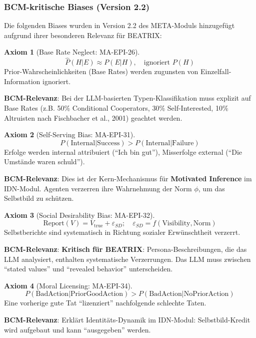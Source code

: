 \documentclass[11pt,a4paper]{article}
\theoremstyle{definition}
\newtheorem{axiom}{Axiom}[section]
\theoremstyle{plain}
\newcommand{\META}{\textsc{META}}
\newcommand{\BEATRIX}{\textsc{BEATRIX}}
\begin{document}
\subsubsection{BCM-kritische Biases (Version 2.2)}

Die folgenden Biases wurden in Version 2.2 des \META-Moduls hinzugefügt aufgrund ihrer besonderen Relevanz für \BEATRIX:

\begin{axiom}[Base Rate Neglect: MA-EPI-26]
\begin{equation}
\hat{P}(H|E) \approx P(E|H), \quad \text{ignoriert } P(H)
\end{equation}
Prior-Wahrscheinlichkeiten (Base Rates) werden zugunsten von Einzelfall-Information ignoriert.

\textbf{BCM-Relevanz}: Bei der LLM-basierten Typen-Klassifikation muss explizit auf Base Rates (z.B. 50\% Conditional Cooperators, 30\% Self-Interested, 10\% Altruisten nach Fischbacher et al., 2001) geachtet werden.
\end{axiom}

\begin{axiom}[Self-Serving Bias: MA-EPI-31]
\begin{equation}
P(\text{Internal}|\text{Success}) > P(\text{Internal}|\text{Failure})
\end{equation}
Erfolge werden internal attribuiert (``Ich bin gut''), Misserfolge external (``Die Umstände waren schuld'').

\textbf{BCM-Relevanz}: Dies ist der Kern-Mechanismus für \textbf{Motivated Inference} im IDN-Modul. Agenten verzerren ihre Wahrnehmung der Norm $\phi$, um das Selbstbild zu schützen.
\end{axiom}

\begin{axiom}[Social Desirability Bias: MA-EPI-32]
\begin{equation}
\text{Report}(V) = V_{\text{true}} + \varepsilon_{SD}; \quad \varepsilon_{SD} = f(\text{Visibility}, \text{Norm})
\end{equation}
Selbstberichte sind systematisch in Richtung sozialer Erwünschtheit verzerrt.

\textbf{BCM-Relevanz}: \textbf{Kritisch für BEATRIX}: Persona-Beschreibungen, die das LLM analysiert, enthalten systematische Verzerrungen. Das LLM muss zwischen ``stated values'' und ``revealed behavior'' unterscheiden.
\end{axiom}

\begin{axiom}[Moral Licensing: MA-EPI-34]
\begin{equation}
P(\text{BadAction}|\text{PriorGoodAction}) > P(\text{BadAction}|\text{NoPriorAction})
\end{equation}
Eine vorherige gute Tat ``lizenziert'' nachfolgende schlechte Taten.

\textbf{BCM-Relevanz}: Erklärt Identitäts-Dynamik im IDN-Modul: Selbstbild-Kredit wird aufgebaut und kann ``ausgegeben'' werden.
\end{axiom}
\end{document}
